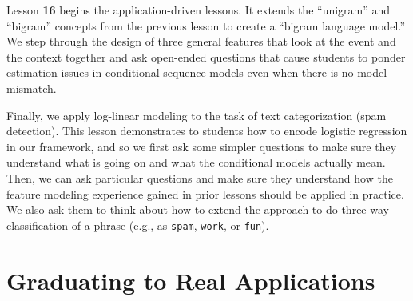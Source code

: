 \documentclass[11pt,letterpaper]{article}
\begin{document}
Lesson \textbf{16} begins the application-driven lessons. It extends the ``unigram'' and ``bigram'' concepts 
from the previous lesson to create a ``bigram language model.'' We step through the design of three general 
features that look at the event and the context together and ask open-ended questions that cause students 
to ponder estimation issues in conditional sequence models even when there is no model mismatch.

Finally, we apply log-linear modeling to the task of text categorization (spam detection). This lesson demonstrates to students how to encode logistic regression in our framework, and so 
we first ask some simpler questions to make sure they understand what is going on and what the conditional models actually mean.
Then, we can ask particular questions and make sure they understand how the feature modeling experience gained in 
prior lessons should be applied in practice. We also ask them to think about how to extend the approach to do three-way classification 
of a phrase (e.g., as \texttt{spam}, \texttt{work}, or \texttt{fun}).



\section{Graduating to Real Applications}\label{sec:history}
\end{document}
